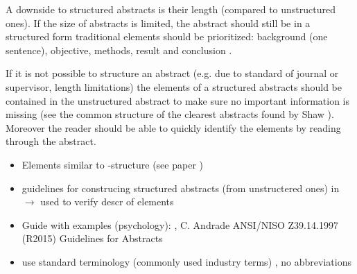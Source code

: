 A downside to structured abstracts is their length (compared to unstructured ones). If the size of abstracts is limited, the abstract should still be in a structured form traditional elements should be prioritized: background (one sentence), objective, methods, result and conclusion \cite{Jedlitschka2008}.

If it is not possible to structure an abstract (e.g. due to standard of journal or supervisor, length limitations) the elements of a structured abstracts should be contained in the unstructured abstract to make sure no important information is missing (see the common structure of the clearest abstracts found by Shaw \cite{shaw2003}). Moreover the reader should be able to quickly identify the elements by reading through the abstract.
\newline
\newline
{}
\begin{itemize}	
\item Elements similar to -structure (see paper )	
\item guidelines for construcing structured abstracts (from unstructered ones) in \cite{KBO2008} $\rightarrow$ used to verify descr of elements
\item Guide with examples (psychology): , C. Andrade
	\newline
	ANSI/NISO Z39.14.1997 (R2015) Guidelines for Abstracts
\item use standard terminology (commonly used industry terms) \cite{Jedlitschka2008}, no abbreviations \cite{KBO2008}
\end{itemize}
